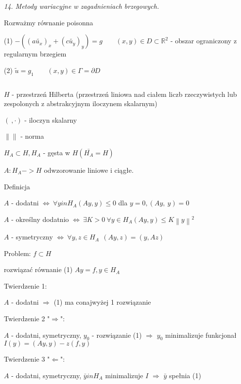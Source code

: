\textit{14. Metody wariacyjne w zagadnieniach brzegowych.}

Rozważmy równanie poisonna

(1) $-((a\tilde{u_x})_x + (c\tilde{u_y})_y) = g\ \ \ \ \ \ \ \ \ (x,y) \in D \subset \mathbb{R}^2$ - obszar ograniczony z regularnym brzegiem

(2) $\tilde{u} = g_1\ \ \ \ \ \ \ \ \ (x,y) \in \Gamma = \partial D$

$\ $

$H$ - przestrzeń Hilberta (przestrzeń liniowa nad ciałem liczb rzeczywistych lub zespolonych z abstrakcyjnym iloczynem skalarnym)

$(\ ,\cdot)$ - iloczyn skalarny

$\left \|  \right \|$ - norma

$H_A \subset H, H_A$ - gęsta w $H (\bar{H_A} = H)$

$A: H_A -> H$ odwzorowanie liniowe i ciągłe.

Definicja

$A$ - dodatni $\Leftrightarrow\ \forall y in H_A (Ay,y) \leqslant 0$    dla $y = 0, (Ay,\ y) = 0$

$A$ - określny dodatnio $\Leftrightarrow\ \exists K > 0\ \forall y \in H_A (Ay,y) \leqslant K \left \| y \right \| ^ 2$

$A$ - symetryczny $\Leftrightarrow\ \forall y,z \in H_A\ \ (Ay,z) = (y,Az)$

Problem: $f \subset H$

    rozwiązać równanie (1) $Ay=f, y \in H_A$
    
Twierdzenie 1:

$A$ - dodatni $\Rightarrow$ (1) ma conajwyżej 1 rozwiązanie

Twierdzenie 2 "$\Rightarrow$":

$A$ - dodatni, symetryczny, $y_0$ - rozwiązanie (1) $\Rightarrow$ $y_0$ minimalizuje funkcjonał $I(y) = (Ay,y) - z(f,y)$

Twierdzenie 3 "$\Leftarrow$":

$A$ - dodatni, symetryczny, $\bar{y} in H_A$ minimalizuje $I$ $\Rightarrow$ $\bar{y}$ spełnia (1)